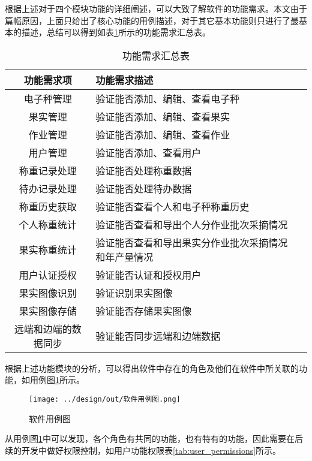 根据上述对于四个模块功能的详细阐述，可以大致了解软件的功能需求。本文由于篇幅原因，上面只给出了核心功能的用例描述，对于其它基本功能则只进行了最基本的描述，总结可以得到如表\ref{tab:req-summary}所示的功能需求汇总表。

\begin{longtable}[ht]{|c|p{8cm}|c|}
\caption{功能需求汇总表}
\label{tab:req-summary}
\\
\hline
功能需求项 & 功能需求描述 \\\hline
电子秤管理 & 验证能否添加、编辑、查看电子秤 \\\hline
果实管理 & 验证能否添加、编辑、查看果实 \\\hline
作业管理 & 验证能否添加、编辑、查看作业 \\\hline
用户管理 & 验证能否添加、查看用户 \\\hline
称重记录处理 & 验证能否处理称重数据 \\\hline
待办记录处理 & 验证能否处理待办数据 \\\hline
称重历史获取 & 验证能否查看个人和电子秤称重历史 \\\hline
个人称重统计 & 验证能否查看和导出个人分作业批次采摘情况 \\\hline
果实称重统计 & 验证能否查看和导出果实分作业批次采摘情况和年产量情况 \\\hline
用户认证授权 & 验证能否认证和授权用户 \\\hline
果实图像识别 & 验证识别果实图像 \\\hline
果实图像存储 & 验证能否存储果实图像 \\\hline
远端和边端的数据同步 & 验证能否同步远端和边端数据 \\\hline
\end{longtable}

根据上述功能模块的分析，可以得出软件中存在的角色及他们在软件中所关联的功能，如用例图\ref{fig:软件用例图}所示。

\begin{figure}[H]
    \centering
    \texttt{[image: ../design/out/软件用例图.png]}
    \caption{软件用例图}
    \label{fig:软件用例图}
\end{figure}

从用例图\ref{fig:软件用例图}中可以发现，各个角色有共同的功能，也有特有的功能，因此需要在后续的开发中做好权限控制，如用户功能权限表\ref{tab:user_permissions}所示。

